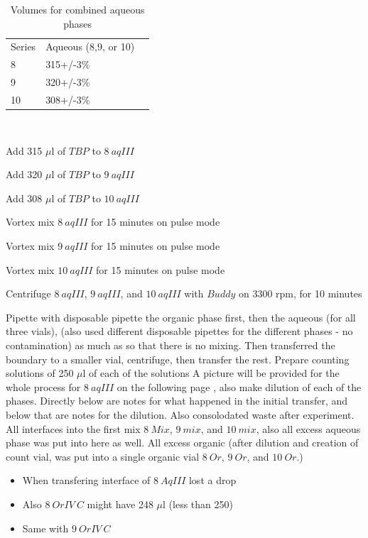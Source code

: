\documentclass[idxtotoc,hyperref,openany,oneside]{labbook} %
\newcommand{\cmark}{\ding{51}}%
\newcommand{\done}{\rlap{$\square$}{\raisebox{2pt}{\large\hspace{1pt}\cmark}}%
  \hspace{-2.5pt}}
\begin{document}
\begin{todolist}
\begin{table}[H]
  \begin{center}
    \caption{Volumes for combined aqueous phases}
    \begin{tabular}{l l l}
      \toprule
      Series & Aqueous (8,9, or 10)\\ 
      8 & 315+/-3\%\\
      9 & 320+/-3\%\\
      10 & 308+/-3\%\\
      \bottomrule
    \end{tabular}
  \end{center}
\end{table}  
\
\item[\done]{Add 315 $\mu$l of $\boxed{TBP}$ to $\boxed{8\ aqIII}$}
\item[\done]{Add 320 $\mu$l of $\boxed{TBP}$ to $\boxed{9\ aqIII}$}
\item[\done]{Add 308 $\mu$l of $\boxed{TBP}$ to $\boxed{10\ aqIII}$}
\item[\done]{Vortex mix $\boxed{8\ aqIII}$
  for 15 minutes on pulse mode}
\item[\done]{Vortex mix $\boxed{9\ aqIII}$ for 15 minutes on pulse mode}
\item[\done]{Vortex mix $\boxed{10\ aqIII}$ for 15 minutes on pulse mode}

\item[\done]{Centrifuge $\boxed{8\ aqIII}$, $\boxed{9\ aqIII}$,
  and $\boxed{10\ aqIII}$
  with $\boxed{Buddy}$ on 3300 rpm, for 10 minutes}

\item[\done]{Pipette with disposable pipette the organic phase
  first, then the aqueous (for all three vials),
  (also used different disposable pipettes for the
  different phases - no contamination)
  as much as so that there is no mixing.
  Then transferred the boundary to a smaller vial,
  centrifuge, then transfer the rest.
  Prepare counting solutions of 250 $\mu$l of each of the solutions
  A picture will be provided for the whole process for
  $\boxed{8\ aqIII}$
  on the following page
  , also make dilution of each of the phases. Directly below
  are notes for what happened in the initial transfer,
  and below that are notes for the dilution.
  Also consolodated waste after experiment. All interfaces into the
  first mix $\boxed{8\ Mix}$, $\boxed{9\ mix}$, and $\boxed{10\ mix}$,
  also all excess aqueous phase was put into here as well.
  All excess organic (after dilution and creation of count vial, was
  put into a single organic vial $\boxed{8\ Or}$, $\boxed{9\ Or}$,
  and $\boxed{10\ Or}$.)}
  \begin{itemize}
  \item{When transfering interface of $\boxed{8\ AqIII}$ lost a drop}
  \item{Also $\boxed{8\ OrIV\ C}$ might have 248 $\mu$l (less than 250)}
  \item{Same with $\boxed{9\ OrIV\ C}$}
  \end{itemize}
  

\end{todolist}
\end{document}
